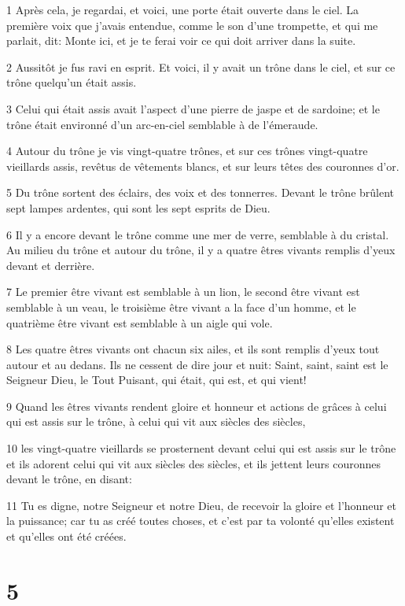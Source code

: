 \par 1 Après cela, je regardai, et voici, une porte était ouverte dans le ciel. La première voix que j'avais entendue, comme le son d'une trompette, et qui me parlait, dit: Monte ici, et je te ferai voir ce qui doit arriver dans la suite.
\par 2 Aussitôt je fus ravi en esprit. Et voici, il y avait un trône dans le ciel, et sur ce trône quelqu'un était assis.
\par 3 Celui qui était assis avait l'aspect d'une pierre de jaspe et de sardoine; et le trône était environné d'un arc-en-ciel semblable à de l'émeraude.
\par 4 Autour du trône je vis vingt-quatre trônes, et sur ces trônes vingt-quatre vieillards assis, revêtus de vêtements blancs, et sur leurs têtes des couronnes d'or.
\par 5 Du trône sortent des éclairs, des voix et des tonnerres. Devant le trône brûlent sept lampes ardentes, qui sont les sept esprits de Dieu.
\par 6 Il y a encore devant le trône comme une mer de verre, semblable à du cristal. Au milieu du trône et autour du trône, il y a quatre êtres vivants remplis d'yeux devant et derrière.
\par 7 Le premier être vivant est semblable à un lion, le second être vivant est semblable à un veau, le troisième être vivant a la face d'un homme, et le quatrième être vivant est semblable à un aigle qui vole.
\par 8 Les quatre êtres vivants ont chacun six ailes, et ils sont remplis d'yeux tout autour et au dedans. Ils ne cessent de dire jour et nuit: Saint, saint, saint est le Seigneur Dieu, le Tout Puisant, qui était, qui est, et qui vient!
\par 9 Quand les êtres vivants rendent gloire et honneur et actions de grâces à celui qui est assis sur le trône, à celui qui vit aux siècles des siècles,
\par 10 les vingt-quatre vieillards se prosternent devant celui qui est assis sur le trône et ils adorent celui qui vit aux siècles des siècles, et ils jettent leurs couronnes devant le trône, en disant:
\par 11 Tu es digne, notre Seigneur et notre Dieu, de recevoir la gloire et l'honneur et la puissance; car tu as créé toutes choses, et c'est par ta volonté qu'elles existent et qu'elles ont été créées.

\chapter{5}

